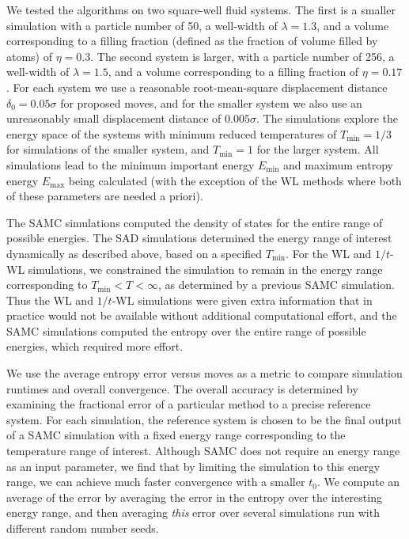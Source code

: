 \documentclass[letterpaper,twocolumn,amsmath,amssymb,pre,aps,10pt]{revtex4-1}
\begin{document}
We tested the algorithms on two square-well fluid systems.  The first
is a smaller simulation with a particle number of 50, a well-width of
$\lambda = 1.3$, and a volume corresponding to a filling fraction
(defined as the fraction of volume filled by atoms) of $\eta =
0.3$. The second system is larger, with a particle number of 256, a
well-width of $\lambda = 1.5$, and a volume corresponding to a filling
fraction of $\eta = 0.17$.  For each system we use a reasonable
root-mean-square displacement distance $\delta_0 = 0.05\sigma$ for
proposed moves, and for the smaller system we also use an unreasonably
small displacement distance of $0.005\sigma$. The simulations explore
the energy space of the systems with minimum reduced temperatures of
$T_{\text{min}} = 1/3$ for simulations of the smaller system, and
$T_{\min}=1$ for the larger system.  All simulations lead to the
minimum important energy $E_{\min}$ and maximum entropy energy
$E_{\max}$ being calculated (with the exception of the WL methods
where both of these parameters are needed a priori).

The SAMC simulations
computed the density of states for the entire range of possible
energies.  The SAD simulations determined the energy range of interest
dynamically as described above, based on a specified $T_{\min}$.  For
the WL and $1/t$-WL simulations, we constrained the simulation to
remain in the energy range corresponding to $T_{\min} < T < \infty$,
as determined by a previous SAMC simulation.  Thus the WL and $1/t$-WL
simulations were given extra information that in practice would not be
available without additional computational effort, and the SAMC simulations
computed the entropy over the entire range of possible energies, which
required more effort.

We use the average entropy error versus moves as a metric to compare
simulation runtimes and overall convergence. The overall accuracy
is determined by examining the fractional error of a particular method to
a precise reference system. For each simulation, the reference system
is chosen to be the final output of a SAMC simulation with a fixed energy range
corresponding to the temperature range of interest.
Although SAMC does not require an energy range as an input parameter,
we find that by limiting the simulation to this energy range, we can
achieve much faster convergence with a smaller $t_0$.  We compute an average
of the error by averaging the error in the entropy over the
interesting energy range, and then averaging \emph{this} error over several
simulations run with different random number seeds.
\end{document}
